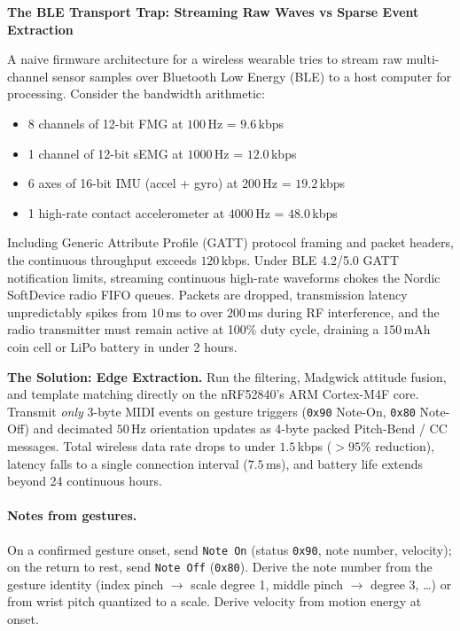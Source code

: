 \begin{trapbox}
\textbf{The BLE Transport Trap: Streaming Raw Waves vs Sparse Event Extraction}

A naive firmware architecture for a wireless wearable tries to stream raw multi-channel sensor samples over Bluetooth Low Energy (BLE) to a host computer for processing. Consider the bandwidth arithmetic:
\begin{itemize}
  \item 8 channels of 12-bit FMG at $100\,$Hz = $9.6\,$kbps
  \item 1 channel of 12-bit sEMG at $1000\,$Hz = $12.0\,$kbps
  \item 6 axes of 16-bit IMU (accel + gyro) at $200\,$Hz = $19.2\,$kbps
  \item 1 high-rate contact accelerometer at $4000\,$Hz = $48.0\,$kbps
\end{itemize}
Including Generic Attribute Profile (GATT) protocol framing and packet headers, the continuous throughput exceeds $120\,$kbps. Under BLE 4.2/5.0 GATT notification limits, streaming continuous high-rate waveforms chokes the Nordic SoftDevice radio FIFO queues. Packets are dropped, transmission latency unpredictably spikes from $10\,$ms to over $200\,$ms during RF interference, and the radio transmitter must remain active at 100\% duty cycle, draining a $150\,\text{mAh}$ coin cell or LiPo battery in under 2 hours.

\textbf{The Solution: Edge Extraction.} Run the filtering, Madgwick attitude fusion, and template matching directly on the nRF52840's ARM Cortex-M4F core. Transmit \emph{only} 3-byte MIDI events on gesture triggers (\texttt{0x90} Note-On, \texttt{0x80} Note-Off) and decimated $50\,$Hz orientation updates as 4-byte packed Pitch-Bend / CC messages. Total wireless data rate drops to under $1.5\,$kbps ($>95\%$ reduction), latency falls to a single connection interval ($7.5\,$ms), and battery life extends beyond 24 continuous hours.
\end{trapbox}

\paragraph{Notes from gestures.} On a confirmed gesture onset, send
\texttt{Note On} (status \texttt{0x90}, note number, velocity); on the return to
rest, send \texttt{Note Off} (\texttt{0x80}). Derive the note number from the
gesture identity (index pinch $\to$ scale degree 1, middle pinch $\to$ degree 3,
\ldots) or from wrist pitch quantized to a scale. Derive velocity from motion
energy at onset.

